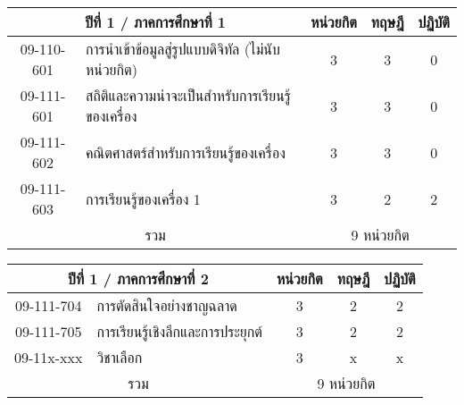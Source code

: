 \renewcommand{\arraystretch}{1.4}
\begin{tabular}{|cp{}|ccc|}
\hline
\multicolumn{2}{|c|}{ปีที่ 1 / ภาคการศึกษาที่ 1} & \multicolumn{1}{c|}{หน่วยกิต} & \multicolumn{1}{c|}{ทฤษฎี} & \multicolumn{1}{c|}{ปฏิบัติ}  \\ \hline
\multicolumn{1}{|c|}{09-110-601}  & การนำเข้าข้อมูลสู่รูปแบบดิจิทัล (ไม่นับหน่วยกิต)  & \multicolumn{1}{c|}{3}        & \multicolumn{1}{c|}{3}     & \multicolumn{1}{c|}{0}                   \\ \hline
\multicolumn{1}{|c|}{09-111-601}  & สถิติและความน่าจะเป็นสำหรับการเรียนรู้ของเครื่อง  & \multicolumn{1}{c|}{3}        & \multicolumn{1}{c|}{3}     & \multicolumn{1}{c|}{0}                   \\ \hline
\multicolumn{1}{|c|}{09-111-602}  & คณิตศาสตร์สำหรับการเรียนรู้ของเครื่อง  & \multicolumn{1}{c|}{3}        & \multicolumn{1}{c|}{3}     & \multicolumn{1}{c|}{0}                   \\ \hline
\multicolumn{1}{|c|}{09-111-603}  & การเรียนรู้ของเครื่อง 1  & \multicolumn{1}{c|}{3}        & \multicolumn{1}{c|}{2}     & \multicolumn{1}{c|}{2}                    \\ \hline
\multicolumn{2}{|c|}{รวม}                        & \multicolumn{3}{c|}{9 หน่วยกิต}                                                                            \\ \hline
\end{tabular}

\vspace{5ex}\par\noindent
\renewcommand{\arraystretch}{1.4}
\begin{tabular}{|cp{}|ccc|}
\hline
\multicolumn{2}{|c|}{ปีที่ 1 / ภาคการศึกษาที่ 2} & \multicolumn{1}{c|}{หน่วยกิต} & \multicolumn{1}{c|}{ทฤษฎี} & \multicolumn{1}{c|}{ปฏิบัติ}  \\ \hline
\multicolumn{1}{|c|}{09-111-704}  & การตัดสินใจอย่างชาญฉลาด  & \multicolumn{1}{c|}{3}        & \multicolumn{1}{c|}{2}     & \multicolumn{1}{c|}{2}                    \\ \hline
\multicolumn{1}{|c|}{09-111-705}  & การเรียนรู้เชิงลึกและการประยุกต์  & \multicolumn{1}{c|}{3}        & \multicolumn{1}{c|}{2}     & \multicolumn{1}{c|}{2}                    \\ \hline
\multicolumn{1}{|c|}{09-11x-xxx}  & วิชาเลือก  & \multicolumn{1}{c|}{3}        & \multicolumn{1}{c|}{x}     & \multicolumn{1}{c|}{x}                   \\ \hline
\multicolumn{2}{|c|}{รวม}                        & \multicolumn{3}{c|}{9 หน่วยกิต}                                                                            \\ \hline
\end{tabular}

